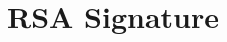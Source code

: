 \documentclass{scribe}
\begin{document}
\section{RSA Signature}

\vspace{10mm}




%

\end{document}
